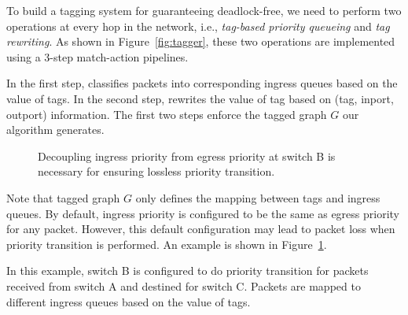  To build a tagging system for guaranteeing deadlock-free, we need to perform two operations at every hop in the network, i.e.,  {\em tag-based priority queueing} and {\em tag rewriting}. As shown in Figure~\ref{fig:tagger}, these two operations are implemented using a 3-step match-action pipelines. 
 
 In the first step, \sysname{} classifies packets into corresponding ingress queues based on the value of tags. In the second step, \sysname{} rewrites the value of tag based on (tag, inport, outport) information. The first two steps enforce the tagged graph $G$ our algorithm generates. 
 
 
  \begin{figure}[t]
 	\centering
 	
 	
 	
 	
 	\caption{Decoupling ingress priority from egress priority at switch B is necessary for ensuring lossless priority transition.}\label{fig:prioritydecoupling}
 	
 \end{figure}
 
 Note that tagged graph $G$ only defines the mapping between tags and ingress queues. By default, ingress priority is configured to be the same as egress priority for any packet. However, this default configuration may lead to packet loss when priority transition is performed. An example is shown in Figure~\ref{fig:prioritydecoupling}.
 
 In this example, switch B is configured to do priority transition for packets received from switch A and destined for switch C. Packets are mapped to different ingress queues based on the value of tags. 
 
